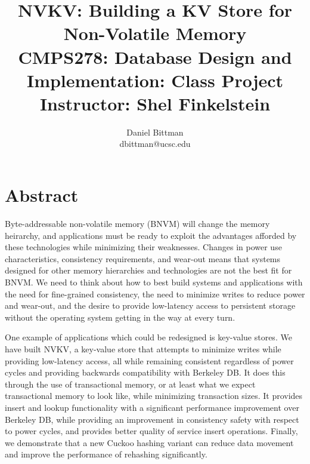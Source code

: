 \documentclass[twocolumn,11pt]{article}
\author{Daniel Bittman \\ dbittman@ucsc.edu}
\title{NVKV: Building a KV Store for Non-Volatile Memory\\{\Large CMPS278:
Database Design and Implementation: Class Project\\\vspace{-2mm}Instructor: Shel Finkelstein}}
\newcommand{\bdb}{Berkeley DB\xspace}
\begin{document}
\biolinum
\maketitle
\libertine 
\renewcommand\ttdefault{lmtt}






\section*{Abstract}


Byte-addressable non-volatile memory (BNVM) will change the memory heirarchy, and
applications must be ready to exploit the advantages afforded by these
technologies while minimizing their weaknesses. Changes in power use
characteristics, consistency requirements, and wear-out means that systems
designed for other memory hierarchies and technologies are not the best fit for
BNVM. We need to think about how to best build systems and applications with the
need for fine-grained consistency, the need to minimize writes to reduce power
and wear-out, and the desire to provide low-latency access to persistent storage
without the operating system getting in the way at every turn.


One example of applications which could be redesigned is key-value stores. We
have built NVKV, a key-value store that attempts to minimize writes while
providing low-latency access, all while remaining consistent regardless of power
cycles and providing backwards compatibility with \bdb. It does this through the
use of transactional memory, or at least what we expect transactional memory to
look like, while minimizing transaction sizes. It provides insert and lookup
functionality with a significant performance improvement over \bdb, while
providing an improvement in consistency safety with respect to power cycles, and
provides better quality of service insert operations. Finally, we demonstrate
that a new Cuckoo hashing variant can reduce data movement and improve the
performance of rehashing significantly.
\end{document}
